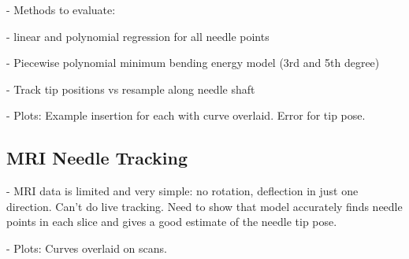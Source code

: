 - Methods to evaluate:

- linear and polynomial regression for all needle points

- Piecewise polynomial minimum bending energy model (3rd and 5th degree)

- Track tip positions vs resample along needle shaft

- Plots: Example insertion for each with curve overlaid. Error for tip pose.

\subsection{MRI Needle Tracking}
- MRI data is limited and very simple: no rotation, deflection in just one direction. Can't do live tracking. Need to show that model accurately finds needle points in each slice and gives a good estimate of the needle tip pose.

- Plots: Curves overlaid on scans.



    


